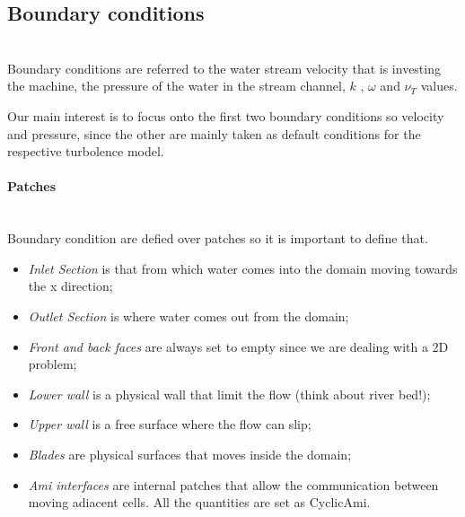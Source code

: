 \documentclass[a4paper,12pt]{article}
\begin{document}
\subsection{Boundary conditions}\mbox{}\\

Boundary conditions are referred to the water stream velocity that is investing the machine, the pressure of the water in the stream channel, $k$ , $\omega$ and $\nu_T$ values.

Our main interest is to focus onto the first two boundary conditions so velocity and pressure, since the other are mainly taken as default conditions for the respective turbolence model.

\paragraph{Patches}\mbox{}\\
Boundary condition are defied over patches so it is important to define that.
\begin{itemize}
\item \emph{Inlet Section} is that from which water comes into the domain moving towards the x direction;
\item \emph{Outlet Section} is where water comes out from the domain;
\item \emph{Front and back faces} are always set to empty since we are dealing with a 2D problem;
\item \emph{Lower wall} is a physical wall that limit the flow (think about river bed!);
\item \emph{Upper wall} is a free surface where the flow can slip;
\item \emph{Blades} are physical surfaces that moves inside the domain;
\item \emph{Ami interfaces} are internal patches that allow the communication between moving adiacent cells. All the quantities are set as CyclicAmi.
\end{itemize}
\end{document}
